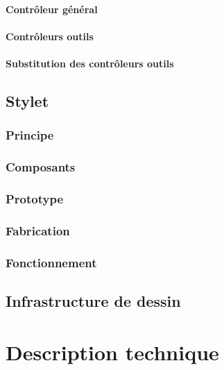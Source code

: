 \documentclass[11pt,a4paper,oldfontcommands]{memoir}
\begin{document}
\subsubsection{Contrôleur général}

\subsubsection{Contrôleurs outils}

\subsubsection{Substitution des contrôleurs outils}

\section{Stylet}

\subsection{Principe}

\subsection{Composants}

\subsection{Prototype}

\subsection{Fabrication}

\subsection{Fonctionnement}

\section{Infrastructure de dessin}


\chapter{Description technique}
\end{document}
